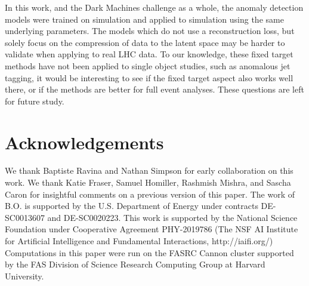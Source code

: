 \documentclass[submission, Phys]{SciPost}
\begin{document}
In this work, and the Dark Machines challenge as a whole, the anomaly detection models were trained on simulation and applied to simulation using the same underlying parameters.
The models which do not use a reconstruction loss, but solely focus on the compression of data to the latent space may be harder to validate when applying to real LHC data.
To our knowledge, these fixed target methods have not been applied to single object studies, such as anomalous jet tagging, it would be interesting to see if the fixed target aspect also works well there, or if the methods are better for full event analyses.
These questions are left for future study.

\vspace{1em}
\section*{Acknowledgements}
We thank Baptiste Ravina and Nathan Simpson for early collaboration on this work.
We thank Katie Fraser, Samuel Homiller, Rashmish Mishra, and Sascha Caron for insightful comments on a previous version of this paper.
The work of B.O. is supported by the U.S. Department of Energy under contracts DE-SC0013607 and DE-SC0020223.
This work is supported by the National Science Foundation under Cooperative Agreement PHY-2019786 (The NSF AI Institute for Artificial Intelligence and Fundamental Interactions, http://iaifi.org/)
Computations in this paper were run on the FASRC Cannon cluster supported by the FAS Division of Science Research Computing Group at Harvard University.


\end{document}
